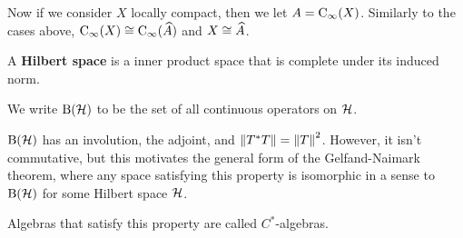 Now if we consider $X$ locally compact, then we let $A = \mathrm C_\infty(X)$. Similarly to the cases above, $\mathrm C_\infty(X) \cong \mathrm C_\infty(\widehat A)$ and $X \cong \widehat A$.

\begin{definition}
    A \textbf{Hilbert space} is a inner product space that is complete under its induced norm.

    We write $\mathrm B(\mathcal H)$ to be the set of all continuous operators on $\mathcal H$.
\end{definition}

$\mathrm B(\mathcal H)$ has an involution, the adjoint, and $\norm{T^*T} = \norm{T}^2$. However, it isn't commutative, but this motivates the general form of the Gelfand-Naimark theorem, where any space satisfying this property is isomorphic in a sense to $\mathrm B(\mathcal H)$ for some Hilbert space $\mathcal H$.

Algebras that satisfy this property are called $C^*$-algebras.